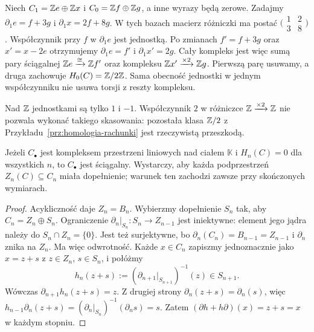 \begin{przyklad}
Niech $C_1=\mathbb{Z} e\oplus\mathbb{Z} x$ i
$C_0=\mathbb{Z} f\oplus\mathbb{Z} g$, a inne wyrazy będą zerowe.
Zadajmy $\partial_1e=f+3g$ i
$\partial_1x=2f+8g$. W tych bazach macierz różniczki
ma postać $\bigl(\begin{smallmatrix}1&2\\3&8\end{smallmatrix}\bigr)$.
Współczynnik przy $f$ w $\partial_1e$ jest jednostką.
Po zmianach $f'=f+3g$ oraz $x'=x-2e$ otrzymujemy
$\partial_1e=f'$ i $\partial_1x'=2g$.
Cały kompleks jest więc sumą pary ściągalnej
$\mathbb{Z} e\xrightarrow{\cong}\mathbb{Z} f'$ oraz kompleksu
$\mathbb{Z} x'\xrightarrow{\times2}\mathbb{Z} g$.
Pierwszą parę usuwamy, a druga zachowuje
$H_0(C)=\mathbb{Z}/2\mathbb{Z}$. Sama obecność jednostki w jednym
współczynniku nie usuwa torsji z reszty kompleksu.
\end{przyklad}

Nad $\mathbb{Z}$ jednostkami są tylko $1$ i $-1$.
Współczynnik $2$ w różniczce
$\mathbb{Z}\xrightarrow{\times2}\mathbb{Z}$ nie pozwala
wykonać takiego skasowania: pozostała
klasa $\mathbb{Z}/2$ z
Przykładu~\ref{prz:homologia-rachunki}
jest rzeczywistą przeszkodą.

\begin{stwierdzenie}
\label{prop:acykliczny-sciagalny}
Jeżeli $C_\bullet$ jest kompleksem
przestrzeni liniowych nad ciałem
$\mathbb K$ i $H_n(C)=0$ dla wszystkich
$n$, to $C_\bullet$ jest ściągalny.
Wystarczy, aby każda podprzestrzeń
$Z_n(C)\subseteq C_n$ miała dopełnienie;
warunek ten zachodzi zawsze przy
skończonych wymiarach.
\end{stwierdzenie}
\begin{proof}
Acykliczność daje $Z_n=B_n$.
Wybierzmy dopełnienie $S_n$ tak, aby
$C_n=Z_n\oplus S_n$. Ograniczenie
$\partial_n|_{S_n}:S_n\to Z_{n-1}$
jest iniektywne: element jego jądra
należy do $S_n\cap Z_n=\{0\}$.
Jest też surjektywne, bo
$\partial_n(C_n)=B_{n-1}=Z_{n-1}$
i $\partial_n$ znika na $Z_n$.
Ma więc odwrotność.
Każde $x\in C_n$ zapiszmy
jednoznacznie jako $x=z+s$
z $z\in Z_n$, $s\in S_n$, i połóżmy
\[
 h_n(z+s)
 :=(\partial_{n+1}|_{S_{n+1}})^{-1}(z)
 \in S_{n+1}.
\]
Wówczas $\partial_{n+1}h_n(z+s)=z$.
Z drugiej strony $\partial_n(z+s)=\partial_n(s)$,
więc
$h_{n-1}\partial_n(z+s)
=(\partial_n|_{S_n})^{-1}(\partial_ns)=s$.
Zatem $(\partial h+h\partial)(x)=z+s=x$
w każdym stopniu.
\end{proof}

